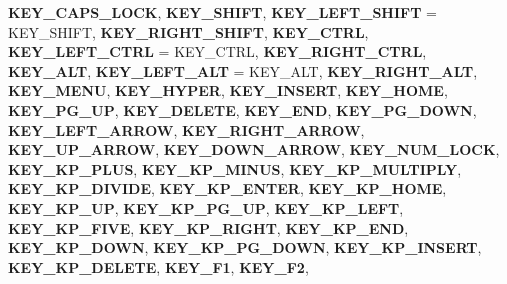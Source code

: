 \begin{DoxyCompactItemize}
{\bfseries K\+E\+Y\+\_\+\+C\+A\+P\+S\+\_\+\+L\+O\+CK}, 
{\bfseries K\+E\+Y\+\_\+\+S\+H\+I\+FT}, 
{\bfseries K\+E\+Y\+\_\+\+L\+E\+F\+T\+\_\+\+S\+H\+I\+FT} = K\+E\+Y\+\_\+\+S\+H\+I\+FT, 
{\bfseries K\+E\+Y\+\_\+\+R\+I\+G\+H\+T\+\_\+\+S\+H\+I\+FT}, 
\newline
{\bfseries K\+E\+Y\+\_\+\+C\+T\+RL}, 
{\bfseries K\+E\+Y\+\_\+\+L\+E\+F\+T\+\_\+\+C\+T\+RL} = K\+E\+Y\+\_\+\+C\+T\+RL, 
{\bfseries K\+E\+Y\+\_\+\+R\+I\+G\+H\+T\+\_\+\+C\+T\+RL}, 
{\bfseries K\+E\+Y\+\_\+\+A\+LT}, 
\newline
{\bfseries K\+E\+Y\+\_\+\+L\+E\+F\+T\+\_\+\+A\+LT} = K\+E\+Y\+\_\+\+A\+LT, 
{\bfseries K\+E\+Y\+\_\+\+R\+I\+G\+H\+T\+\_\+\+A\+LT}, 
{\bfseries K\+E\+Y\+\_\+\+M\+E\+NU}, 
{\bfseries K\+E\+Y\+\_\+\+H\+Y\+P\+ER}, 
\newline
{\bfseries K\+E\+Y\+\_\+\+I\+N\+S\+E\+RT}, 
{\bfseries K\+E\+Y\+\_\+\+H\+O\+ME}, 
{\bfseries K\+E\+Y\+\_\+\+P\+G\+\_\+\+UP}, 
{\bfseries K\+E\+Y\+\_\+\+D\+E\+L\+E\+TE}, 
\newline
{\bfseries K\+E\+Y\+\_\+\+E\+ND}, 
{\bfseries K\+E\+Y\+\_\+\+P\+G\+\_\+\+D\+O\+WN}, 
{\bfseries K\+E\+Y\+\_\+\+L\+E\+F\+T\+\_\+\+A\+R\+R\+OW}, 
{\bfseries K\+E\+Y\+\_\+\+R\+I\+G\+H\+T\+\_\+\+A\+R\+R\+OW}, 
\newline
{\bfseries K\+E\+Y\+\_\+\+U\+P\+\_\+\+A\+R\+R\+OW}, 
{\bfseries K\+E\+Y\+\_\+\+D\+O\+W\+N\+\_\+\+A\+R\+R\+OW}, 
{\bfseries K\+E\+Y\+\_\+\+N\+U\+M\+\_\+\+L\+O\+CK}, 
{\bfseries K\+E\+Y\+\_\+\+K\+P\+\_\+\+P\+L\+US}, 
\newline
{\bfseries K\+E\+Y\+\_\+\+K\+P\+\_\+\+M\+I\+N\+US}, 
{\bfseries K\+E\+Y\+\_\+\+K\+P\+\_\+\+M\+U\+L\+T\+I\+P\+LY}, 
{\bfseries K\+E\+Y\+\_\+\+K\+P\+\_\+\+D\+I\+V\+I\+DE}, 
{\bfseries K\+E\+Y\+\_\+\+K\+P\+\_\+\+E\+N\+T\+ER}, 
\newline
{\bfseries K\+E\+Y\+\_\+\+K\+P\+\_\+\+H\+O\+ME}, 
{\bfseries K\+E\+Y\+\_\+\+K\+P\+\_\+\+UP}, 
{\bfseries K\+E\+Y\+\_\+\+K\+P\+\_\+\+P\+G\+\_\+\+UP}, 
{\bfseries K\+E\+Y\+\_\+\+K\+P\+\_\+\+L\+E\+FT}, 
\newline
{\bfseries K\+E\+Y\+\_\+\+K\+P\+\_\+\+F\+I\+VE}, 
{\bfseries K\+E\+Y\+\_\+\+K\+P\+\_\+\+R\+I\+G\+HT}, 
{\bfseries K\+E\+Y\+\_\+\+K\+P\+\_\+\+E\+ND}, 
{\bfseries K\+E\+Y\+\_\+\+K\+P\+\_\+\+D\+O\+WN}, 
\newline
{\bfseries K\+E\+Y\+\_\+\+K\+P\+\_\+\+P\+G\+\_\+\+D\+O\+WN}, 
{\bfseries K\+E\+Y\+\_\+\+K\+P\+\_\+\+I\+N\+S\+E\+RT}, 
{\bfseries K\+E\+Y\+\_\+\+K\+P\+\_\+\+D\+E\+L\+E\+TE}, 
{\bfseries K\+E\+Y\+\_\+\+F1}, 
\newline
{\bfseries K\+E\+Y\+\_\+\+F2}, 

\end{DoxyCompactItemize}
